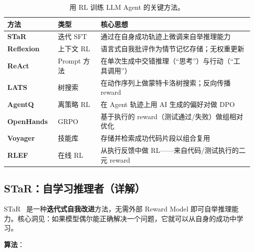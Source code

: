 \begin{table}[ht!]
\centering\small
\caption{用 RL 训练 LLM Agent 的关键方法。}
\noindent\begin{tabularx}{\linewidth}{@{}l l Z{1}@{}}
\toprule
\textbf{方法} & \textbf{类型} & \textbf{核心思想} \\
\midrule
\textbf{STaR}~\cite{zelikman2022star} & 迭代 SFT & 通过在自身成功轨迹上微调来自举推理能力 \\
\textbf{Reflexion}~\cite{shinn2023reflexion} & 上下文 RL & 语言式自我批评作为情节记忆存储；无权重更新 \\
\textbf{ReAct}~\cite{yao2023react} & Prompt 方法 & 在单次生成中交错推理（``思考''）与行动（``工具调用''） \\
\textbf{LATS}~\cite{zhou2024lats} & 树搜索 & 在动作序列上做蒙特卡洛树搜索；反向传播 reward \\
\textbf{AgentQ}~\cite{putta2024agentq} & 离策略 RL & 在 Agent 轨迹上用 AI 生成的偏好对做 DPO \\
\textbf{OpenHands}~\cite{wang2024openhands} & GRPO & 基于执行的 reward（测试通过/失败）做组相对优化 \\
\textbf{Voyager}~\cite{wang2023voyager} & 技能库 & 存储并检索成功代码片段以组合复用 \\
\textbf{RLEF}~\cite{le2024rlef} & 在线 RL & 从执行反馈中做 RL——来自代码/测试执行的二元 reward \\
\bottomrule
\end{tabularx}
\end{table}

\subsection{STaR：自学习推理者（详解）}
\label{star-self-taught-reasoner-detailed}

STaR~\cite{zelikman2022star} 是一种\textbf{迭代式自我改进}方法，无需外部 Reward Model 即可自举推理能力。核心洞见：如果模型偶尔能正确解决一个问题，它就可以从自身的成功中学习。

\textbf{算法}：

